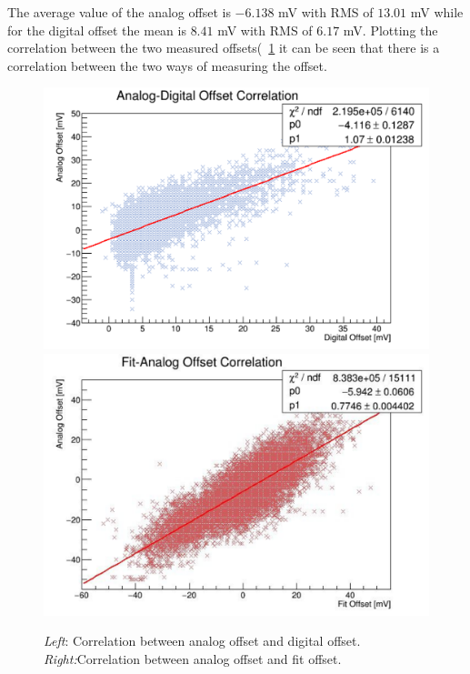 \documentclass[main.tex]{subfiles}
\begin{document}
The average value of the analog offset is $-6.138 $ mV with RMS of $13.01 $ mV while for the digital offset the mean is $8.41$ mV with RMS of $6.17 $ mV. Plotting the correlation between the two measured offsets(~\ref{fig:offsetcor} it can be seen that there is a correlation between the two ways of measuring the offset.

\begin{figure}[h]
  \centering
  \includegraphics[width=\textwidth]{./Pictures/offsetscor.pdf}
  \endminipage
  \includegraphics[width=\textwidth]{./Pictures/fitanalogcor.pdf}
  \endminipage
  \caption{\textit{Left}: Correlation between analog offset and digital offset. \textit{Right:}Correlation between analog offset and fit offset.}
  \label{fig:offsetcor}
\end{figure}
\end{document}
